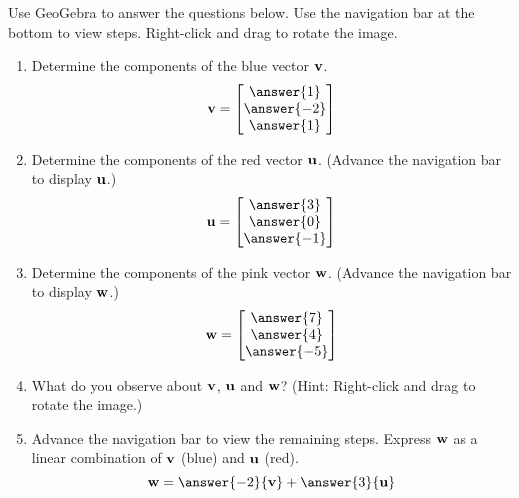 \documentclass{ximera}
\begin{document}
\begin{problem}
\begin{problem}\label{prob:lincombtwovectors4a}
Use GeoGebra to answer the questions below.  Use the navigation bar at the bottom to view steps.  Right-click and drag to rotate the image.
\begin{center} 
\end{center}
\begin{enumerate}
    \item Determine the components of the blue vector ${\bf v}$.
    $${\bf v}=\begin{bmatrix}\answer{1}\\\answer{-2}\\\answer{1}\end{bmatrix}$$
    \item
    Determine the components of the red vector ${\bf u}$.  (Advance the navigation bar to display ${\bf u}$.)
    $${\bf u}=\begin{bmatrix}\answer{3}\\\answer{0}\\\answer{-1}\end{bmatrix}$$
    \item
    Determine the components of the pink vector ${\bf w}$. (Advance the navigation bar to display ${\bf w}$.)
    $${\bf w}=\begin{bmatrix}\answer{7}\\\answer{4}\\\answer{-5}\end{bmatrix}$$
    \item 
    What do you observe about ${\bf v}$, ${\bf u}$ and ${\bf w}$?  (Hint:  Right-click and drag to rotate the image.)
    \begin{multipleChoice}
 \end{multipleChoice}
 \item Advance the navigation bar to view the remaining steps.  Express ${\bf w}$ as a linear combination of ${\bf v}$ (blue) and ${\bf u}$ (red).
 $${\bf w}=\answer{-2}{\bf v}+\answer{3}{\bf u}$$
\end{enumerate}
\end{problem}


\end{problem}
\end{document}

